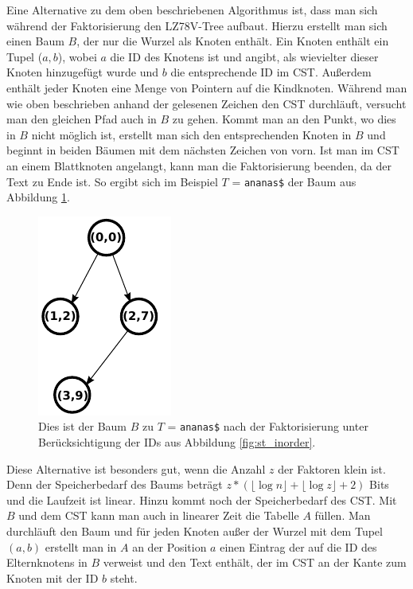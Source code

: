 \documentclass[a4paper,11pt]{scrartcl}%
\theoremstyle{nonumberplain}
\theoremstyle{change}
\theoremstyle{nonumberplain}
\theoremstyle{change}
\theoremstyle{nonumberplain}
\begin{document}
		Eine Alternative zu dem oben beschriebenen Algorithmus ist, dass man sich während der Faktorisierung den LZ78V-Tree aufbaut. Hierzu erstellt man sich einen  Baum $B$, der nur die Wurzel als Knoten enthält. Ein Knoten enthält ein Tupel ($a ,b$), wobei $a$ die ID des Knotens ist und angibt, als wievielter dieser Knoten hinzugefügt wurde und $b$ die entsprechende ID im CST. Außerdem enthält jeder Knoten eine Menge von Pointern auf die Kindknoten. Während man wie oben beschrieben anhand der gelesenen Zeichen den CST durchläuft, versucht man den gleichen Pfad auch in $B$ zu gehen. Kommt man an den Punkt, wo dies in $B$ nicht möglich ist, erstellt man sich den entsprechenden Knoten in $B$ und beginnt in beiden Bäumen mit dem nächsten Zeichen von vorn. Ist man im CST an einem Blattknoten angelangt, kann man die Faktorisierung beenden, da der Text zu Ende ist. So ergibt sich im Beispiel $T$ = \texttt{ananas\$} der Baum aus Abbildung \ref{fig:ausschnitt}. 
				\begin{figure}[h]
					\centering
					\includegraphics[scale=0.8]{ananas_LZ78VTree(ausschnitt)}
					\caption{Dies ist der Baum $B$ zu $T$ = \texttt{ananas\$} nach der Faktorisierung unter Berücksichtigung der IDs aus Abbildung \ref{fig:st_inorder}.}
					\label{fig:ausschnitt}
				\end{figure}Diese Alternative ist besonders gut, wenn die Anzahl $z$ der Faktoren klein ist. Denn der Speicherbedarf des Baums beträgt $z * (\lfloor\log n\rfloor + \lfloor\log z\rfloor + 2)$ Bits und die Laufzeit ist linear. Hinzu kommt noch der Speicherbedarf des CST.
		Mit $B$ und dem CST kann man auch in linearer Zeit die Tabelle $A$ füllen. Man durchläuft den Baum und für jeden Knoten außer der Wurzel mit dem Tupel $(a, b)$ erstellt man in $A$ an der Position $a$ einen Eintrag der auf die ID des Elternknotens in $B$ verweist und den Text enthält, der im CST an der Kante zum Knoten mit der ID $b$ steht.
		
\end{document}

